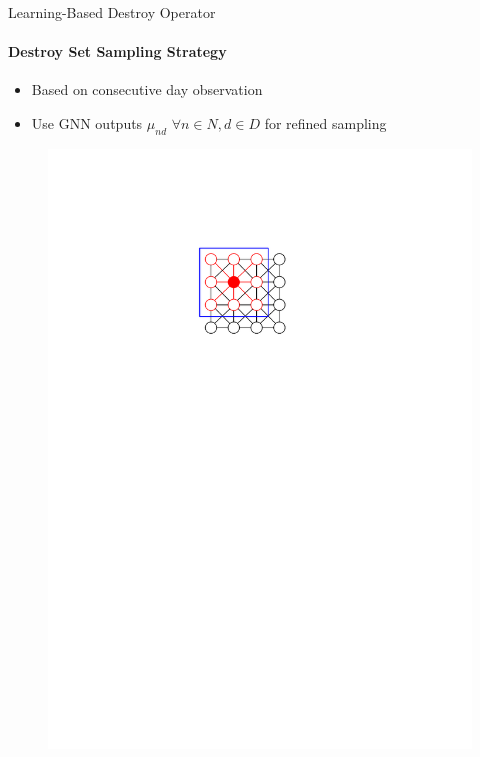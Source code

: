 \documentclass[aspectratio=1610]{beamer}
\newcommand{\important}[1]{{\color{green!60!black}#1}}
\begin{document}
\begin{frame}{Learning-Based Destroy Operator}
	\framesubtitle{Destroy Set Sampling Strategy}
	\begin{itemize}
		\item Based on \important{consecutive day} observation
		\item Use \important{GNN} outputs $\mu_{nd}$ $\forall n \in N, d \in D$ for refined sampling
	\end{itemize}
	\begin{figure}
		\begin{overprint}
			\centering\includegraphics[width=\textwidth, page=17]{figures/graphics.pdf}

\end{overprint}
\end{figure}
\end{frame}
\end{document}
